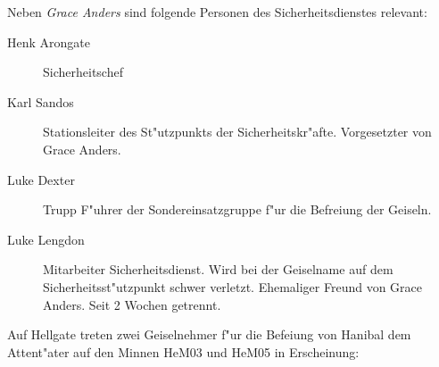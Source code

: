 
Neben \emph{Grace Anders} sind folgende Personen des Sicherheitsdienstes relevant:

\begin{description}
    \item[Henk Arongate] Sicherheitschef    
    \item[Karl Sandos] Stationsleiter des St"utzpunkts der Sicherheitskr"afte. Vorgesetzter von Grace Anders.
    \item[Luke Dexter] Trupp F"uhrer der Sondereinsatzgruppe f"ur die Befreiung der Geiseln.
    \item[Luke Lengdon] Mitarbeiter Sicherheitsdienst. Wird bei der Geiselname auf dem Sicherheitsst"utzpunkt schwer 
        verletzt. Ehemaliger Freund von Grace Anders. Seit 2 Wochen getrennt.
\end{description}

\vfill\pagebreak


Auf Hellgate treten zwei Geiselnehmer f"ur die Befeiung von Hanibal dem Attent"ater auf den Minnen HeM03 und HeM05 in
Erscheinung:

